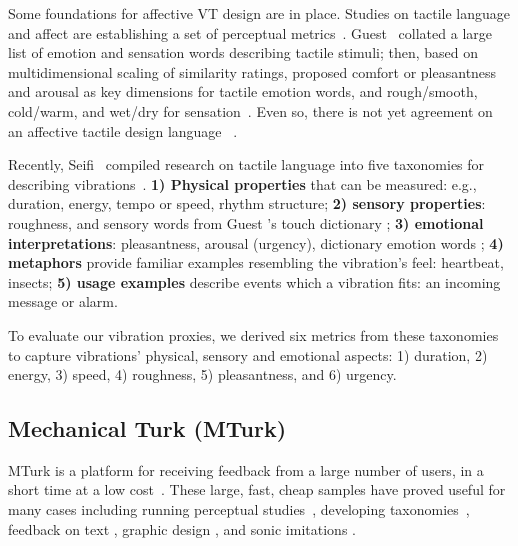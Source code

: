 Some foundations for affective VT design are in place. Studies on tactile language and affect are establishing a set of perceptual metrics~\cite{Obrist2013,Seifi2015}. Guest \etal\ collated a large list of emotion and sensation words describing tactile stimuli; then, based on multidimensional scaling of similarity ratings, proposed comfort or pleasantness and arousal as key dimensions for tactile emotion words, and rough/smooth, cold/warm, and wet/dry for sensation~\cite{Obrist2013}.
Even so, there is not yet agreement on an affective tactile design language~ \cite{Jansson-Boyd2011}.

Recently, Seifi \etal\ compiled research on tactile language into five taxonomies for describing vibrations~\cite{Seifi2015}.  \textbf{1) Physical properties} that can be measured: e.g., duration, energy, tempo or speed, rhythm structure; 
\textbf{2) sensory properties}: roughness, and sensory words from  Guest \etal's touch dictionary \cite{Guest2011};
\textbf{3) emotional interpretations}: pleasantness, arousal (urgency), dictionary emotion words \cite{Guest2011};
\textbf{4) metaphors} provide familiar examples resembling the vibration's feel: heartbeat, insects;
\textbf{5) usage examples} describe %
events which a vibration fits: an incoming message or alarm.

To evaluate our vibration proxies, we derived six metrics from these taxonomies to capture vibrations' physical, sensory and emotional aspects:  
1) duration, 2) energy, 3) speed, 4) roughness, 5) pleasantness, and 6) urgency. 


\subsection{Mechanical Turk (MTurk)}
MTurk is a platform for receiving feedback from a large number of users, in a short time at a low cost~\cite{mutrkgeneral,visualperceptionturk}. These large, fast, cheap samples have proved useful for many cases including running perceptual studies~\cite{visualperceptionturk}, developing taxonomies~\cite{taxonomyturk}, feedback on text \cite{Siangliulue2015}, graphic design \cite{Xu2014}, and sonic imitations \cite{Cartwright2015}.

